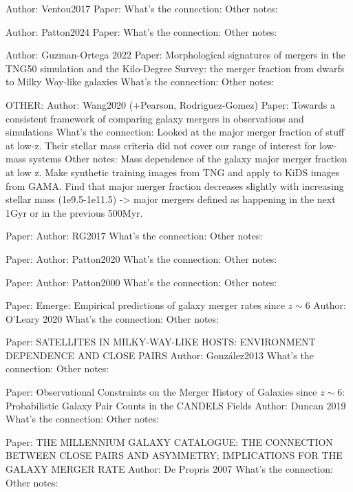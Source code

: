     
    Author: Ventou2017
    Paper: 
    What's the connection: 
    Other notes: 
    
    Author: Patton2024
    Paper: 
    What's the connection:
    Other notes:
    

    Author: Guzman-Ortega 2022
    Paper: Morphological signatures of mergers in the TNG50 simulation and the Kilo-Degree Survey: the merger fraction from dwarfs to Milky Way-like galaxies
    What's the connection:
    Other notes:


OTHER:
    Author: Wang2020 (+Pearson, Rodriguez-Gomez)
    Paper: Towards a consistent framework of comparing galaxy mergers in observations and simulations
    What's the connection: Looked at the major merger fraction of stuff at low-z. Their stellar mass criteria did not cover our range of interest for low-mass systems
    Other notes: Mass dependence of the galaxy major merger fraction at low z. Make synthetic training images from TNG and apply to KiDS images from GAMA. Find that major merger fraction decreases slightly with increasing stellar mass (1e9.5-1e11.5) -> 
    major mergers defined as happening in the next 1Gyr or in the previous 500Myr. 
    
    Paper: 
    Author: RG2017
    What's the connection: 
    Other notes: 
    
    
    
    Paper: 
    Author: Patton2020
    What's the connection:
    Other notes:
    
    Paper: 
    Author: Patton2000
    What's the connection:
    Other notes:
    
    
    
    Paper: Emerge: Empirical predictions of galaxy merger rates since $z \sim 6$ 
    Author: O'Leary 2020
    What's the connection:
    Other notes:
    
    
    
    
    Paper: SATELLITES IN MILKY-WAY-LIKE HOSTS: ENVIRONMENT DEPENDENCE AND CLOSE PAIRS
    Author: González2013
    What's the connection:
    Other notes:
    
    Paper: Observational Constraints on the Merger History of Galaxies since $z\sim6$: Probabilistic Galaxy Pair Counts in the CANDELS Fields
    Author: Duncan 2019
    What's the connection:
    Other notes:
    
    Paper: THE MILLENNIUM GALAXY CATALOGUE: THE CONNECTION BETWEEN CLOSE PAIRS AND ASYMMETRY; IMPLICATIONS FOR THE GALAXY MERGER RATE
    Author: De Propris 2007
    What's the connection:
    Other notes:
    
